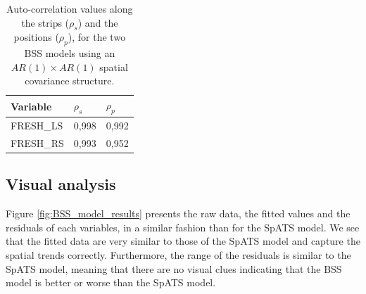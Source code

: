 \begin{table}[htbp]
  \centering
  \caption[Auto-correlation values for the BSS models]{Auto-correlation values along the strips ($\rho_{s}$) and the positions ($\rho_{p}$), for the two BSS models using an $AR(1) \times AR(1)$ spatial covariance structure.}
    \begin{tabular}{lrr}
    \toprule
    Variable & \multicolumn{1}{l}{$\rho_{s}$} & \multicolumn{1}{l}{$\rho_{p}$} \\
    \midrule
    FRESH\_LS &   0,998    &    0,992 \\
    FRESH\_RS &   0,993    &   0,952  \\
    \bottomrule
    \end{tabular}%
  \label{tab:BSS_variance_values}%
\end{table}%

\subsection{Visual analysis}
Figure \ref{fig:BSS_model_results} presents the raw data, the fitted values and the residuals of each variables, in a similar fashion than for the SpATS model. We see that the fitted data are very similar to those of the SpATS model and capture the spatial trends correctly. Furthermore, the range of the residuals is similar to the SpATS model, meaning that there are no visual clues indicating that the BSS model is better or worse than the SpATS model.

